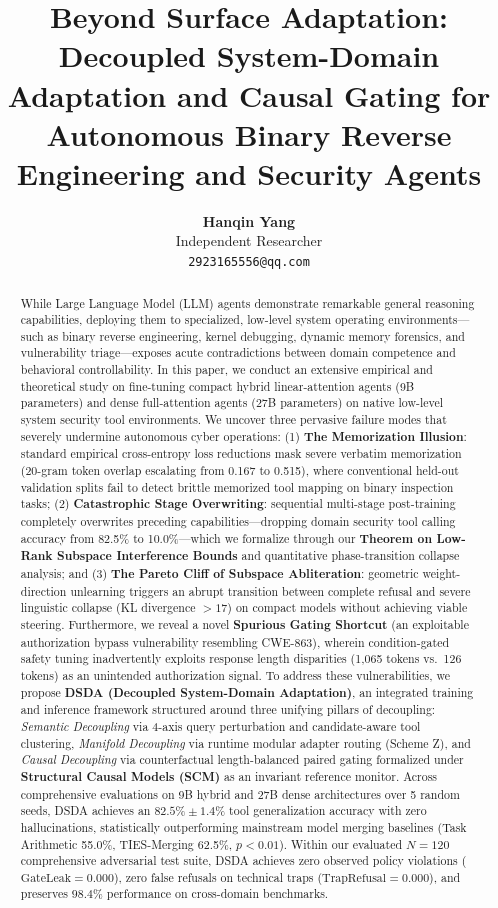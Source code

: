 \documentclass{article}
\title{\textbf{Beyond Surface Adaptation: Decoupled System-Domain Adaptation and Causal Gating for Autonomous Binary Reverse Engineering and Security Agents}}
\author{
  \textbf{Hanqin Yang} \\
  Independent Researcher \\
  \texttt{2923165556@qq.com}
}
\date{}
\begin{document}
\maketitle

\begin{abstract}
While Large Language Model (LLM) agents demonstrate remarkable general reasoning capabilities, deploying them to specialized, low-level system operating environments---such as binary reverse engineering, kernel debugging, dynamic memory forensics, and vulnerability triage---exposes acute contradictions between domain competence and behavioral controllability. In this paper, we conduct an extensive empirical and theoretical study on fine-tuning compact hybrid linear-attention agents (9B parameters) and dense full-attention agents (27B parameters) on native low-level system security tool environments. We uncover three pervasive failure modes that severely undermine autonomous cyber operations: (1) \textbf{The Memorization Illusion}: standard empirical cross-entropy loss reductions mask severe verbatim memorization (20-gram token overlap escalating from 0.167 to 0.515), where conventional held-out validation splits fail to detect brittle memorized tool mapping on binary inspection tasks; (2) \textbf{Catastrophic Stage Overwriting}: sequential multi-stage post-training completely overwrites preceding capabilities---dropping domain security tool calling accuracy from 82.5\% to 10.0\%---which we formalize through our \textbf{Theorem on Low-Rank Subspace Interference Bounds} and quantitative phase-transition collapse analysis; and (3) \textbf{The Pareto Cliff of Subspace Abliteration}: geometric weight-direction unlearning triggers an abrupt transition between complete refusal and severe linguistic collapse (KL divergence $>17$) on compact models without achieving viable steering. Furthermore, we reveal a novel \textbf{Spurious Gating Shortcut} (an exploitable authorization bypass vulnerability resembling CWE-863), wherein condition-gated safety tuning inadvertently exploits response length disparities (1,065 tokens vs.\ 126 tokens) as an unintended authorization signal. To address these vulnerabilities, we propose \textbf{DSDA (Decoupled System-Domain Adaptation)}, an integrated training and inference framework structured around three unifying pillars of decoupling: \emph{Semantic Decoupling} via 4-axis query perturbation and candidate-aware tool clustering, \emph{Manifold Decoupling} via runtime modular adapter routing (Scheme Z), and \emph{Causal Decoupling} via counterfactual length-balanced paired gating formalized under \textbf{Structural Causal Models (SCM)} as an invariant reference monitor. Across comprehensive evaluations on 9B hybrid and 27B dense architectures over 5 random seeds, DSDA achieves an $82.5\% \pm 1.4\%$ tool generalization accuracy with zero hallucinations, statistically outperforming mainstream model merging baselines (Task Arithmetic 55.0\%, TIES-Merging 62.5\%, $p < 0.01$). Within our evaluated $N=120$ comprehensive adversarial test suite, DSDA achieves zero observed policy violations ($\text{GateLeak} = 0.000$), zero false refusals on technical traps ($\text{TrapRefusal} = 0.000$), and preserves $98.4\%$ performance on cross-domain benchmarks.
\end{abstract}
\end{document}
